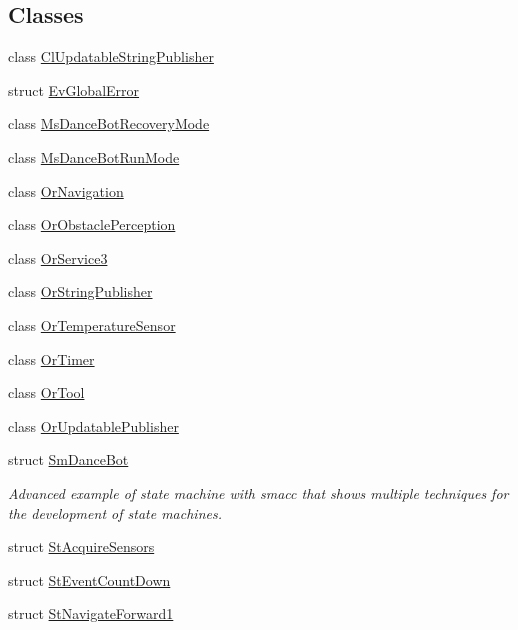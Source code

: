 \subsection*{Classes}
\begin{DoxyCompactItemize}
\item 
class \hyperlink{classsm__dance__bot_1_1ClUpdatableStringPublisher}{Cl\+Updatable\+String\+Publisher}
\item 
struct \hyperlink{structsm__dance__bot_1_1EvGlobalError}{Ev\+Global\+Error}
\item 
class \hyperlink{classsm__dance__bot_1_1MsDanceBotRecoveryMode}{Ms\+Dance\+Bot\+Recovery\+Mode}
\item 
class \hyperlink{classsm__dance__bot_1_1MsDanceBotRunMode}{Ms\+Dance\+Bot\+Run\+Mode}
\item 
class \hyperlink{classsm__dance__bot_1_1OrNavigation}{Or\+Navigation}
\item 
class \hyperlink{classsm__dance__bot_1_1OrObstaclePerception}{Or\+Obstacle\+Perception}
\item 
class \hyperlink{classsm__dance__bot_1_1OrService3}{Or\+Service3}
\item 
class \hyperlink{classsm__dance__bot_1_1OrStringPublisher}{Or\+String\+Publisher}
\item 
class \hyperlink{classsm__dance__bot_1_1OrTemperatureSensor}{Or\+Temperature\+Sensor}
\item 
class \hyperlink{classsm__dance__bot_1_1OrTimer}{Or\+Timer}
\item 
class \hyperlink{classsm__dance__bot_1_1OrTool}{Or\+Tool}
\item 
class \hyperlink{classsm__dance__bot_1_1OrUpdatablePublisher}{Or\+Updatable\+Publisher}
\item 
struct \hyperlink{structsm__dance__bot_1_1SmDanceBot}{Sm\+Dance\+Bot}
\begin{DoxyCompactList}\small\item\em Advanced example of state machine with smacc that shows multiple techniques for the development of state machines. \end{DoxyCompactList}\item 
struct \hyperlink{structsm__dance__bot_1_1StAcquireSensors}{St\+Acquire\+Sensors}
\item 
struct \hyperlink{structsm__dance__bot_1_1StEventCountDown}{St\+Event\+Count\+Down}
\item 
struct \hyperlink{structsm__dance__bot_1_1StNavigateForward1}{St\+Navigate\+Forward1}
\item 

\end{DoxyCompactItemize}

